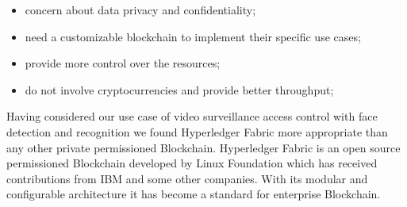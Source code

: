\begin{itemize}
    \item concern about data privacy and confidentiality;
    \item need a customizable blockchain to implement their specific use cases;
    \item provide more control over the resources;
    \item do not involve cryptocurrencies and provide better throughput;
\end{itemize}

Having considered our use case of video surveillance access control with face detection and recognition we found Hyperledger Fabric more appropriate than any other private permissioned Blockchain. 
Hyperledger Fabric is an open source permissioned Blockchain developed by Linux Foundation which has received contributions from IBM and some other companies. With its modular and configurable architecture it has become a standard for enterprise Blockchain. 


